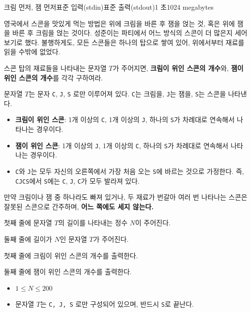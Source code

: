 \def\probtitle{크림 먼저, 잼 먼저}
\def\probno{C} %

\begin{problem}{\probtitle}{표준 입력(stdin)}{표준 출력(stdout)}{1 초}{1024 megabytes}

영국에서 스콘을 맛있게 먹는 방법은 위에 크림을 바른 후 잼을 얹는 것, 혹은 위에 잼을 바른 후 크림을 얹는 것이다. 성준이는 파티에서 어느 방식의 스콘이 더 많은지 세어 보기로 했다. 불행하게도, 모든 스콘들은 하나의 탑으로 쌓여 있어, 위에서부터 재료를 읽을 수밖에 없었다.

스콘 탑의 재료들을 나타내는 문자열 $T$가 주어지면, \textbf{크림이 위인 스콘의 개수}와, \textbf{잼이 위인 스콘의 개수}를 각각 구하여라.

문자열 $T$는 문자 \texttt{C}, \texttt{J}, \texttt{S} 로만 이루어져 있다. \texttt{C}는 크림을, \texttt{J}는 잼을, \texttt{S}는 스콘을 나타낸다. 

\begin{itemize}[topsep=0pt,noitemsep]
  \item \textbf{크림이 위인 스콘}: 1개 이상의 \texttt{C}, 1개 이상의 \texttt{J}, 하나의 \texttt{S}가 차례대로 연속해서 나타나는 경우이다.
  \item \textbf{잼이 위인 스콘}: 1개 이상의 \texttt{J}, 1개 이상의 \texttt{C}, 하나의 \texttt{S}가 차례대로 연속해서 나타나는 경우이다.
  \item \texttt{C}와 \texttt{J}는 모두 자신의 오른쪽에서 가장 처음 오는 \texttt{S}에 바르는 것으로 가정한다. 즉, \texttt{CJCS}에서 \texttt{S}에는 \texttt{C}, \texttt{J}, \texttt{C}가 모두 발라져 있다.
\end{itemize}

만약 크림이나 잼 중 하나라도 빠져 있거나, 두 재료가 번갈아 여러 번 나타나는 스콘은 잘못된 스콘으로 간주하며, \textbf{어느 쪽에도 세지 않는다.}

\InputFile

첫째 줄에 문자열 $T$의 길이를 나타내는 정수 $N$이 주어진다.

둘째 줄에 길이가 $N$인 문자열 $T$가 주어진다.

\OutputFile

첫째 줄에 크림이 위인 스콘의 개수를 출력한다.

둘째 줄에 잼이 위인 스콘의 개수를 출력한다.

\Constraints

\begin{itemize}[topsep=0pt,noitemsep]
    \item $1\leq N\leq 200$
    \item 문자열 $T$는 \texttt{C, J, S} 로만 구성되어 있으며, 반드시 \texttt{S}로 끝난다.
\end{itemize}


\end{problem}
